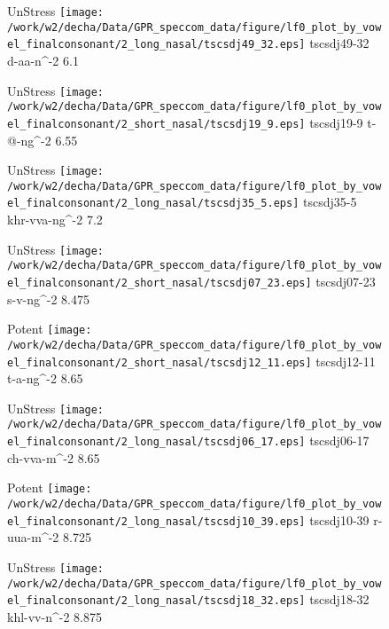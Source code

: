 \documentclass{article}
\begin{document}
\begin{figure}[t]
\begin{minipage}[b]{.24\textwidth}
UnStress
\centering
\texttt{[image: /work/w2/decha/Data/GPR\_speccom\_data/figure/lf0\_plot\_by\_vowel\_finalconsonant/2\_long\_nasal/tscsdj49\_32.eps]}
tscsdj49-32 d-aa-n\textasciicircum-2 6.1
\end{minipage}
\begin{minipage}[b]{.24\textwidth}
UnStress
\centering
\texttt{[image: /work/w2/decha/Data/GPR\_speccom\_data/figure/lf0\_plot\_by\_vowel\_finalconsonant/2\_short\_nasal/tscsdj19\_9.eps]}
tscsdj19-9 t-@-ng\textasciicircum-2 6.55
\end{minipage}
\begin{minipage}[b]{.24\textwidth}
UnStress
\centering
\texttt{[image: /work/w2/decha/Data/GPR\_speccom\_data/figure/lf0\_plot\_by\_vowel\_finalconsonant/2\_long\_nasal/tscsdj35\_5.eps]}
tscsdj35-5 khr-vva-ng\textasciicircum-2 7.2
\end{minipage}
\begin{minipage}[b]{.24\textwidth}
UnStress
\centering
\texttt{[image: /work/w2/decha/Data/GPR\_speccom\_data/figure/lf0\_plot\_by\_vowel\_finalconsonant/2\_short\_nasal/tscsdj07\_23.eps]}
tscsdj07-23 s-v-ng\textasciicircum-2 8.475
\end{minipage}
\end{figure}

\begin{figure}[t]
\begin{minipage}[b]{.24\textwidth}
\colorbox{Apricot}{Potent}
\centering
\texttt{[image: /work/w2/decha/Data/GPR\_speccom\_data/figure/lf0\_plot\_by\_vowel\_finalconsonant/2\_short\_nasal/tscsdj12\_11.eps]}
tscsdj12-11 t-a-ng\textasciicircum-2 8.65
\end{minipage}
\begin{minipage}[b]{.24\textwidth}
UnStress
\centering
\texttt{[image: /work/w2/decha/Data/GPR\_speccom\_data/figure/lf0\_plot\_by\_vowel\_finalconsonant/2\_long\_nasal/tscsdj06\_17.eps]}
tscsdj06-17 ch-vva-m\textasciicircum-2 8.65
\end{minipage}
\begin{minipage}[b]{.24\textwidth}
\colorbox{Apricot}{Potent}
\centering
\texttt{[image: /work/w2/decha/Data/GPR\_speccom\_data/figure/lf0\_plot\_by\_vowel\_finalconsonant/2\_long\_nasal/tscsdj10\_39.eps]}
tscsdj10-39 r-uua-m\textasciicircum-2 8.725
\end{minipage}
\begin{minipage}[b]{.24\textwidth}
UnStress
\centering
\texttt{[image: /work/w2/decha/Data/GPR\_speccom\_data/figure/lf0\_plot\_by\_vowel\_finalconsonant/2\_long\_nasal/tscsdj18\_32.eps]}
tscsdj18-32 khl-vv-n\textasciicircum-2 8.875
\end{minipage}
\end{figure}
\end{document}
